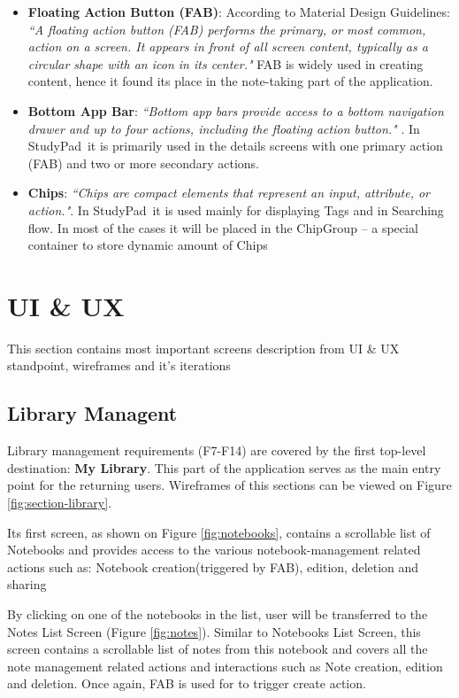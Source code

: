 \documentclass[thesis=B,english]{FITthesis}[2012/10/20]
\newcommand{\appname}{StudyPad}
\newcommand{\quoting}[1]{\textit{``#1"}}
\begin{document}
\begin{itemize}
	\item \textbf{Floating Action Button (FAB)}: According to Material Design Guidelines: \quoting{A floating action button (FAB) performs the primary, or most common, action on a screen. It appears in front of all screen content, typically as a circular shape with an icon in its center.} \cite{material-fab} FAB is widely used in creating content, hence it found its place in the note-taking part of the application.
	\item \textbf{Bottom App Bar}: \quoting{Bottom app bars provide access to a bottom navigation drawer and up to four actions, including the floating action button.} \cite{material-bottomappbar}. In \appname\ it is primarily used in the details screens with one primary action (FAB) and two or more secondary actions.
	\item \textbf{Chips}: \quoting{Chips are compact elements that represent an input, attribute, or action.}\cite{material-chips}. In \appname\ it is used mainly for displaying Tags and in Searching flow. In most of the cases it will be placed in the ChipGroup -- a special container to store dynamic amount of Chips
\end{itemize}

\section{UI \& UX}

This section contains most important screens description from UI \& UX standpoint, wireframes and it's iterations

\subsection{Library Managent}
Library management requirements (F7-F14) are covered by the first top-level destination: \textbf{My Library}. This part of the application serves as the main entry point for the returning users. Wireframes of this sections can be viewed on Figure \ref{fig:section-library}.
	
	Its first screen, as shown on Figure \ref{fig:notebooks}, contains a scrollable list of Notebooks and provides access to the various notebook-management related actions such as: Notebook creation(triggered by FAB), edition, deletion and sharing
		
	By clicking on one of the notebooks in the list, user will be transferred to the Notes List Screen (Figure \ref{fig:notes}). Similar to Notebooks List Screen, this screen contains a scrollable list of notes from this notebook and  covers all the note management related actions and interactions such as Note creation, edition and deletion. Once again, FAB is used for to trigger create action.
	
\end{document}
